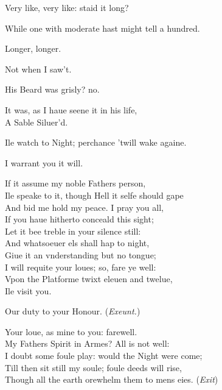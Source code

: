\documentclass[a5paper,DIV=calc,11pt]{scrbook}
\newcommand{\updatemarks}{\markboth{Act \Roman{act}}{Scene \Roman{act}--\Roman{scene}}}
\begin{document}
\begin{drama*}
    \hamspeaks Very like, very like: staid it long?
    
    \horspeaks While one with moderate hast might tell a hundred.
    
     Longer, longer.
    
    \horspeaks Not when I saw't.
    
    \hamspeaks His Beard was grisly? no.
    
    \horspeaks It was, as I haue seene it in his life,\\
    A Sable Siluer'd.
    
    \hamspeaks Ile watch to Night; perchance 'twill wake againe.
    
    \horspeaks I warrant you it will.
    
    \hamspeaks If it assume my noble Fathers person,\\
    Ile speake to it, though Hell it selfe should gape\\
    And bid me hold my peace. I pray you all,\\
    If you haue hitherto conceald this sight;\\
    Let it bee treble in your silence still:\\
    And whatsoeuer els shall hap to night,\\
    Giue it an vnderstanding but no tongue;\\
    I will requite your loues; so, fare ye well:\\
    Vpon the Platforme twixt eleuen and twelue,\\
    Ile visit you.
    
     Our duty to your Honour. \hfill(\textit{Exeunt.})
    
    \hamspeaks Your loue, as mine to you: farewell.\\
    My Fathers Spirit in Armes? All is not well:\\
    I doubt some foule play: would the Night were come;\\
    Till then sit still my soule; foule deeds will rise,\\
    Though all the earth orewhelm them to mens eies. \hfill(\textit{Exit})
\end{drama*}

\scene

\updatemarks

\end{document}
